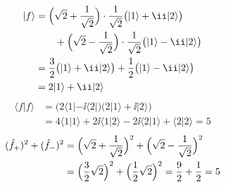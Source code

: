 \begin{align*}
  |f\rangle&=\Bigl(\sqrt{2}+\frac{1}{\sqrt{2}}\Bigr)\cdot\frac{1}{\sqrt{2}}\bigl(|1\rangle+\ii|2\rangle\bigr)\\
  &\qquad+\Bigl(\sqrt{2}-\frac{1}{\sqrt{2}}\Bigr)\cdot\frac{1}{\sqrt{2}}\bigl(|1\rangle-\ii|2\rangle\bigr)\\
  &=\frac{3}{2}\bigl(|1\rangle+\ii|2\rangle\bigr)+\frac{1}{2}\bigl(|1\rangle-\ii|2\rangle\bigr)\\
  &=2|1\rangle+\ii|2\rangle
\end{align*}
\begin{align*}
  \langle f|f\rangle&=\bigl(2\langle1|-\ii\langle2|\bigr)\bigl(2|1\rangle+\ii|2\rangle\bigr)\\
  &=4\langle1|1\rangle+2\ii\langle1|2\rangle-2\ii\langle2|1\rangle+\langle2|2\rangle=5
\end{align*}
\begin{align*}
  (\hat{f}_{+})^{2}+(\hat{f}_{-})^{2}&=\Bigl(\sqrt{2}+\frac{1}{\sqrt{2}}\Bigr)^{2}+\Bigl(\sqrt{2}-\frac{1}{\sqrt{2}}\Bigr)^{2}\\
  &=\Bigl(\frac{3}{2}\sqrt{2}\Bigr)^{2}+\Bigl(\frac{1}{2}\sqrt{2}\Bigr)^{2}=\frac{9}{2}+\frac{1}{2}=5
\end{align*}
